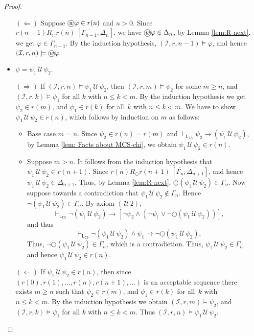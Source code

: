 \documentclass[envcountsect,envcountsame,oribibl,orivec]{llncs}
\newcommand*\circled[1]{\tikz[baseline=(char.base)]{
		\node[shape=circle,draw,inner sep=0.4pt] (char) {#1};}}
\newcommand{\lnext}{\bigcirc}
\newcommand{\luntil}{{\,\mathcal{U}\,}}
\newcommand{\wprevious}{\circled{\textit{w}}}
\newcommand{\CS}{\textsf{CS}}
\newcommand{\system}{\mathcal{I}}
\renewcommand{\phi}{\varphi}
\newcommand{\RO}[4]{#1 R_\lnext #2\ [#3, #4]}
\begin{document}
\begin{proof}
\begin{itemize}
		$(\Leftarrow)$ Suppose $\wprevious \phi \in r(n)$ and  $n>0$.  Since $\RO{r(n-1)}{r(n)}{\overline{\Gamma_{n-1}}}{\overline{\Delta_{n}}}$, we have $\wprevious \phi \in \Delta_{n}$, by Lemma \ref{lem:R-next}, we get $\phi \in \Gamma_{n-1}$. By the induction hypothesis, $(\system, r, n-1) \models  \phi$, and hence $(\system, r, n) \models \wprevious \phi$. 
		
		\item $\psi = \psi_1 \luntil \psi_2$.
		
		$(\Rightarrow)$ If $(\system, r, n) \models  \psi_1 \luntil \psi_2$, then $(\system, r, m) \models  \psi_2$ for some $m \geq n$, and $(\system, r, k) \models  \psi_1$ for all $k$ with $n \leq k < m$. By the induction hypothesis we get $\psi_2 \in r(m)$, and $\psi_1 \in r(k)$ for all~$k$ with $n \leq k < m$. We have to show $\psi_1 \luntil \psi_2 \in r(n)$, which follows by induction on $m$ as follows:
		\begin{itemize}
			\item
			Base case $m=n$. Since $\psi_2 \in r(n) = r(m)$ and $\vdash_{\mathsf{L}_\CS} \psi_2 \rightarrow (\psi_1 \luntil \psi_2)$, by Lemma \ref{lem: Facts about MCS-chi}, we obtain $\psi_1 \luntil \psi_2 \in r(n)$. 
			
			\item
			Suppose $m > n$.  It follows from the induction hypothesis that $\psi_1 \luntil \psi_2 \in r(n+1)$. Since $\RO{r(n)}{r(n+1)}{ \overline{\Gamma_n}}{ \overline{\Delta_{n+1}}}$, and hence $\psi_1 \luntil \psi_2 \in \Delta_{n+1}$. Thus, by Lemma \ref{lem:R-next}, $\lnext (\psi_1 \luntil \psi_2) \in \Gamma_n$. Now suppose towards a contradiction that $\psi_1 \luntil \psi_2 \not\in \Gamma_n$. Hence $\neg(\psi_1 \luntil \psi_2) \in \Gamma_n$. By axiom $(\luntil 2)$, 
			\[\vdash_{\mathsf{L}_\CS}  \neg (\psi_1 \luntil \psi_2) \rightarrow [\neg \psi_2 \wedge (\neg \psi_1 \vee \neg \lnext (\psi_1 \luntil \psi_2))], \]
			and thus 
			\[\vdash_{\mathsf{L}_\CS}  \neg (\psi_1 \luntil \psi_2) \wedge \psi_1 \rightarrow \neg \lnext (\psi_1 \luntil \psi_2), \]
			Thus, $\neg \lnext (\psi_1 \luntil \psi_2) \in \Gamma_n$, which is a contradiction. Thus, $\psi_1 \luntil \psi_2 \in \Gamma_n$ and hence $\psi_1 \luntil \psi_2  \in r(n)$.
			
		\end{itemize}
		
		$(\Leftarrow)$ If $\psi_1 \luntil \psi_2 \in r(n)$, then since $(r(0), r(1), \ldots, r(n),r(n+1),\ldots)$ is an acceptable sequence there exists $m \geq n$ such that $\psi_2 \in r(m)$, and $\psi_1 \in r(k)$ for all~$k$ with $n \leq k < m$. By the induction hypothesis we obtain 
		$(\system, r, m) \models  \psi_2$, and $(\system, r, k) \models  \psi_1$ for all $k$ with $n \leq k < m$. Thus 
		$(\system, r, n) \models  \psi_1 \luntil \psi_2$.
		

\end{itemize}
\end{proof}
\end{document}
